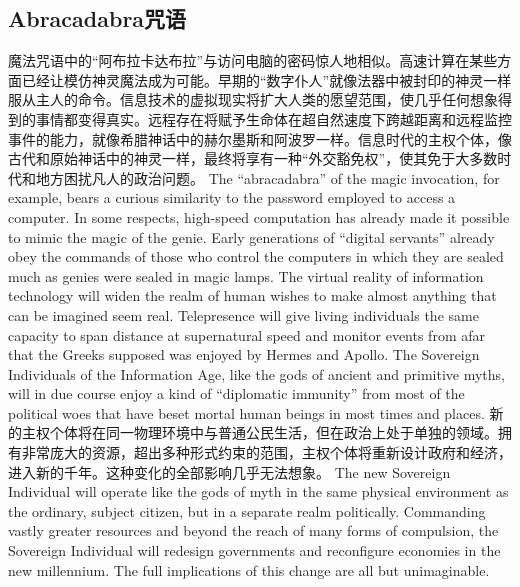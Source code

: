 \subsection{Abracadabra咒语}
\begin{paracol}{2}[]
魔法咒语中的“阿布拉卡达布拉”与访问电脑的密码惊人地相似。高速计算在某些方面已经让模仿神灵魔法成为可能。早期的“数字仆人”就像法器中被封印的神灵一样服从主人的命令。信息技术的虚拟现实将扩大人类的愿望范围，使几乎任何想象得到的事情都变得真实。远程存在将赋予生命体在超自然速度下跨越距离和远程监控事件的能力，就像希腊神话中的赫尔墨斯和阿波罗一样。信息时代的主权个体，像古代和原始神话中的神灵一样，最终将享有一种“外交豁免权”，使其免于大多数时代和地方困扰凡人的政治问题。
\switchcolumn
The ``abracadabra'' of the magic invocation, for example, bears a curious similarity to the password employed to access a computer. In some respects, high-speed computation has already made it possible to mimic the magic of the genie. Early generations of ``digital servants'' already obey the commands of those who control the computers in which they are sealed much as genies were sealed in magic lamps. The virtual reality of information technology will widen the realm of human wishes to make almost anything that can be imagined seem real. Telepresence will give living individuals the same capacity to span distance at supernatural speed and monitor events from afar that the Greeks supposed was enjoyed by Hermes and Apollo. The Sovereign Individuals of the Information Age, like the gods of ancient and primitive myths, will in due course enjoy a kind of ``diplomatic immunity'' from most of the political woes that have beset mortal human beings in most times and places.
\switchcolumn*
新的主权个体将在同一物理环境中与普通公民生活，但在政治上处于单独的领域。拥有非常庞大的资源，超出多种形式约束的范围，主权个体将重新设计政府和经济，进入新的千年。这种变化的全部影响几乎无法想象。
\switchcolumn
The new Sovereign Individual will operate like the gods of myth in the same physical environment as the ordinary, subject citizen, but in a separate realm politically. Commanding vastly greater resources and beyond the reach of many forms of compulsion, the Sovereign Individual will redesign governments and reconfigure economies in the new millennium. The full implications of this change are all but unimaginable.
\end{paracol}

